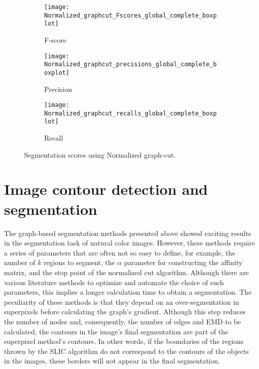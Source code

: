 \begin{figure}[!ht]
    \centering
    \begin{subfigure}[b]{0.3\textwidth}
        \texttt{[image: Normalized\_graphcut\_Fscores\_global\_complete\_boxplot]}
        \caption{F-score}
    \end{subfigure}     
    \begin{subfigure}[b]{0.3\textwidth}
    	\centering
    	\texttt{[image: Normalized\_graphcut\_precisions\_global\_complete\_boxplot]}
        \caption{Precision}
    \end{subfigure}     
    \begin{subfigure}[b]{0.3\textwidth}
    	\centering
        \texttt{[image: Normalized\_graphcut\_recalls\_global\_complete\_boxplot]}
        \caption{Recall}
    \end{subfigure} 
        	    
    \caption{Segmentation scores using Normalized graph-cut.}\label{fig:boxplot_normalized_graphcut}    
\end{figure}

\section{Image contour detection and segmentation}

The graph-based segmentation methods presented above showed exciting results in the segmentation task of natural color images. However, these methods require a series of parameters that are often not so easy to define, for example, the number of $k$ regions to segment, the $\alpha$ parameter for constructing the affinity matrix, and the stop point of the normalized cut algorithm. Although there are various literature methods to optimize and automate the choice of such parameters, this implies a longer calculation time to obtain a segmentation. The peculiarity of these methods is that they depend on an over-segmentation in superpixels before calculating the graph's gradient. Although this step reduces the number of nodes and, consequently, the number of edges and EMD to be calculated, the contours in the image's final segmentation are part of the superpixel method's contours. In other words, if the boundaries of the regions thrown by the SLIC algorithm do not correspond to the contours of the objects in the images, these borders will not appear in the final segmentation. 

